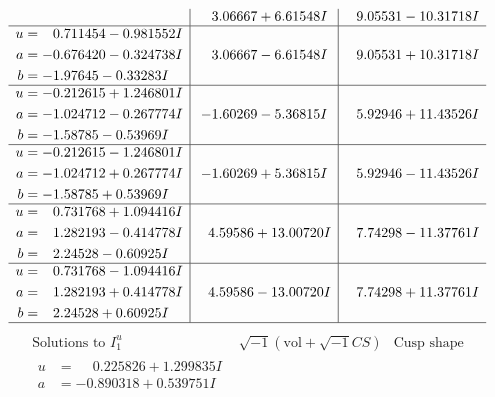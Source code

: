 \documentclass[1p]{elsarticle_modified}
\theoremstyle{definition}
\newcommand{\I}{\sqrt{-1}}
\begin{document}
$$\begin{array}{c|c|c}
 & \phantom{-}3.06667 + 6.61548 I & \phantom{-}9.05531 - 10.31718 I \\ \hline\begin{aligned}
u &= \phantom{-}0.711454 - 0.981552 I \\
a &= -0.676420 - 0.324738 I \\
b &= -1.97645 - 0.33283 I\end{aligned}
 & \phantom{-}3.06667 - 6.61548 I & \phantom{-}9.05531 + 10.31718 I \\ \hline\begin{aligned}
u &= -0.212615 + 1.246801 I \\
a &= -1.024712 - 0.267774 I \\
b &= -1.58785 - 0.53969 I\end{aligned}
 & -1.60269 - 5.36815 I & \phantom{-}5.92946 + 11.43526 I \\ \hline\begin{aligned}
u &= -0.212615 - 1.246801 I \\
a &= -1.024712 + 0.267774 I \\
b &= -1.58785 + 0.53969 I\end{aligned}
 & -1.60269 + 5.36815 I & \phantom{-}5.92946 - 11.43526 I \\ \hline\begin{aligned}
u &= \phantom{-}0.731768 + 1.094416 I \\
a &= \phantom{-}1.282193 - 0.414778 I \\
b &= \phantom{-}2.24528 - 0.60925 I\end{aligned}
 & \phantom{-}4.59586 + 13.00720 I & \phantom{-}7.74298 - 11.37761 I \\ \hline\begin{aligned}
u &= \phantom{-}0.731768 - 1.094416 I \\
a &= \phantom{-}1.282193 + 0.414778 I \\
b &= \phantom{-}2.24528 + 0.60925 I\end{aligned}
 & \phantom{-}4.59586 - 13.00720 I & \phantom{-}7.74298 + 11.37761 I\\
 \hline 
 \end{array}$$\newpage$$\begin{array}{c|c|c}  
\text{Solutions to }I^u_{1}& \I (\text{vol} + \sqrt{-1}CS) & \text{Cusp shape}\\
 \hline 
\begin{aligned}
u &= \phantom{-}0.225826 + 1.299835 I \\
a &= -0.890318 + 0.539751 I \\

\end{aligned}
\end{array}$$
\end{document}
